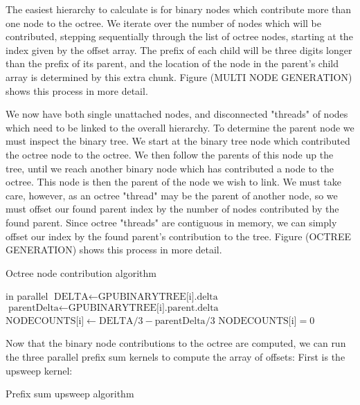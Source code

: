 \documentclass{thesis}
\begin{document}
The easiest hierarchy to calculate is for binary nodes which contribute more than one node to the octree. We iterate over the number of nodes which will be contributed, stepping sequentially through the list of octree nodes, starting at the index given by the offset array. The prefix of each child will be three digits longer than the prefix of its parent, and the location of the node in the parent's child array is determined by this extra chunk. Figure (MULTI NODE GENERATION) shows this process in more detail.

We now have both single unattached nodes, and disconnected "threads" of nodes which need to be linked to the overall hierarchy. To determine the parent node we must inspect the binary tree. We start at the binary tree node which contributed the octree node to the octree. We then follow the parents of this node up the tree, until we reach another binary node which has contributed a node to the octree. This node is then the parent of the node we wish to link. We must take care, however, as an octree "thread" may be the parent of another node, so we must offset our found parent index by the number of nodes contributed by the found parent. Since octree "threads" are contiguous in memory, we can simply offset our index by the found parent's contribution to the tree. Figure (OCTREE GENERATION) shows this process in more detail.


\begin{algorithm}
    \label{alg:NodeContributions}
    \caption{Octree node contribution algorithm}
    \begin{algorithmic}
         in parallel
                \State $\text{DELTA} \gets \text{GPUBINARYTREE[i].delta}$
                \State $\text{parentDelta} \gets \text{GPUBINARYTREE[i].parent.delta}$
                \State $\text{NODECOUNTS[i]} \gets \text{DELTA}/3 - \text{parentDelta}/3$
            \Else
                \State $\text{NODECOUNTS[i]} = 0$
            \EndIf
        \EndFor
    \end{algorithmic}
\end{algorithm}

Now that the binary node contributions to the octree are computed, we can run the three parallel prefix sum kernels to compute the array of offsets:
First is the upsweep kernel:
\begin{algorithm}
    \label{alg:PrefixUpsweep}
    \caption{Prefix sum upsweep algorithm}
    \begin{algorithmic}
        \For{}
        \EndFor
    \end{algorithmic}
\end{algorithm}
\end{document}
